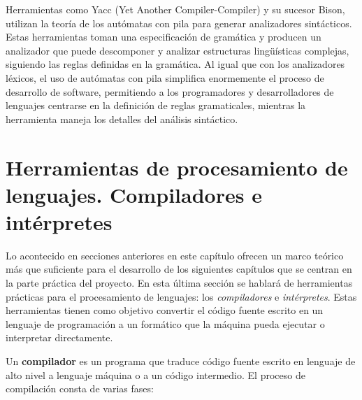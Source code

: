 Herramientas como Yacc (Yet Another Compiler-Compiler) y su sucesor Bison, utilizan la teoría de los autómatas con pila para generar analizadores sintácticos. Estas herramientas toman una especificación de gramática y producen un analizador que puede descomponer y analizar estructuras lingüísticas complejas, siguiendo las reglas definidas en la gramática. Al igual que con los analizadores léxicos, el uso de autómatas con pila simplifica enormemente el proceso de desarrollo de software, permitiendo a los programadores y desarrolladores de lenguajes centrarse en la definición de reglas gramaticales, mientras la herramienta maneja los detalles del análisis sintáctico.

\section{Herramientas de procesamiento de lenguajes. Compiladores e intérpretes}\label{section:compiladores}
Lo acontecido en secciones anteriores en este capítulo ofrecen un marco teórico más que suficiente para el desarrollo de los siguientes capítulos que se centran en la parte práctica del proyecto. En esta última sección se hablará de herramientas prácticas para el procesamiento de lenguajes: los \textit{compiladores} e \textit{intérpretes}. Estas herramientas tienen como objetivo convertir el código fuente escrito en un lenguaje de programación a un formático que la máquina pueda ejecutar o interpretar directamente.

Un \textbf{compilador} es un programa que traduce código fuente escrito en lenguaje de alto nivel a lenguaje máquina o a un código intermedio. El proceso de compilación consta de varias fases:


